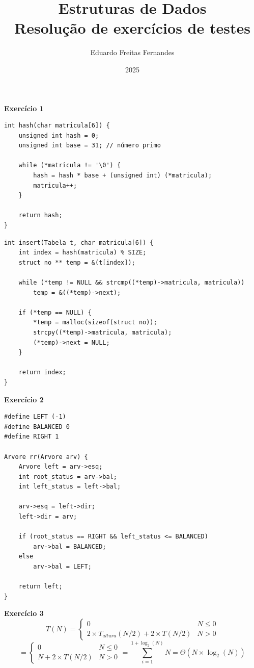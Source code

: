 \documentclass[a4paper,11pt]{article}
\title{Estruturas de Dados\\ Resolução de exercícios de testes}
\author{Eduardo Freitas Fernandes}
\date{2025}
\begin{document}
	
\maketitle
	
	
\noindent \textbf{Exercício 1}

\begin{verbatim}
int hash(char matricula[6]) {
	unsigned int hash = 0;
	unsigned int base = 31; // número primo
	
	while (*matricula != '\0') {
		hash = hash * base + (unsigned int) (*matricula);
		matricula++;
	}
	
	return hash;
}
\end{verbatim}

\begin{verbatim}
int insert(Tabela t, char matricula[6]) {
	int index = hash(matricula) % SIZE;
	struct no ** temp = &(t[index]);
	
	while (*temp != NULL && strcmp((*temp)->matricula, matricula))
		temp = &((*temp)->next);
	
	if (*temp == NULL) {
		*temp = malloc(sizeof(struct no));
		strcpy((*temp)->matricula, matricula);
		(*temp)->next = NULL;
	}
	
	return index;
}
\end{verbatim}

\newpage
	
\noindent \textbf{Exercício 2}

\begin{verbatim}
#define LEFT (-1)
#define BALANCED 0
#define RIGHT 1

Arvore rr(Arvore arv) {
	Arvore left = arv->esq;
	int root_status = arv->bal;
	int left_status = left->bal;
	
	arv->esq = left->dir;
	left->dir = arv;
	
	if (root_status == RIGHT && left_status <= BALANCED)
		arv->bal = BALANCED;
	else
		arv->bal = LEFT;
	
	return left;
}
\end{verbatim}

	
\noindent \textbf{Exercício 3}\\
\[
	T(N) =
	\begin{cases}
		0 & N \leq 0 \\
		2 \times T_{altura}(N/2) + 2 \times T(N/2) & N > 0
	\end{cases}
\]
\[
	=
	\begin{cases}
		0 & N \leq 0 \\
		N + 2 \times T(N/2) & N > 0
	\end{cases}
	= \sum_{i=1}^{1+\log_2(N)} N = \Theta(N \times \log_2(N))
\]
	
\end{document}
